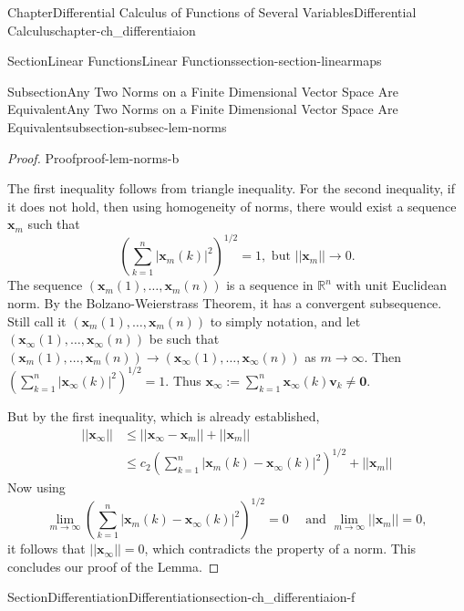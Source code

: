 \documentclass[oneside,10pt,]{book}
\numberwithin{equation}{section}
\newcommand{\amp}{&}
\begin{document}
\begin{chapterptx}{Chapter}{Differential Calculus of Functions of Several Variables}{}{Differential Calculus}{}{}{chapter-ch_differentiaion}
\begin{sectionptx}{Section}{Linear Functions}{}{Linear Functions}{}{}{section-section-linearmaps}
\begin{subsectionptx}{Subsection}{Any Two Norms on a Finite Dimensional Vector Space Are Equivalent}{}{Any Two Norms on a Finite Dimensional Vector Space Are Equivalent}{}{}{subsection-subsec-lem-norms}
\begin{proof}{Proof}{}{proof-lem-norms-b}
\par
The first inequality follows from triangle inequality. For the second inequality, if it does not hold, then using homogeneity of norms, there would exist a sequence \({\mathbf x}_{m}\) such that%
\begin{equation*}
\left(\sum_{k=1}^{n}|{\mathbf x}_{m}(k)|^{2}\right)^{1/2}=1, \text{ but } ||{\mathbf x}_{m}||\to 0.
\end{equation*}
The sequence \(({\mathbf x}_m(1), \ldots, {\mathbf x}_m(n))\) is a sequence in \(\mathbb R^{n}\) with unit Euclidean norm. By the Bolzano-Weierstrass Theorem, it has a convergent subsequence. Still call it \(({\mathbf x}_m(1), \ldots, {\mathbf x}_m(n))\) to simply notation, and let \(({\mathbf x}_{\infty}(1), \ldots, {\mathbf x}_{\infty}(n))\) be such that \(({\mathbf x}_{m}(1), \ldots, {\mathbf x}_{m}(n))\to ({\mathbf x}_{\infty}(1), \ldots, {\mathbf x}_{\infty}(n))\) as \(m\to \infty\). Then \(\left(\sum_{k=1}^{n}|{\mathbf x}_{\infty}(k)|^{2}\right)^{1/2}=1\). Thus \({\mathbf x}_{\infty}:=\sum_{k=1}^{n}{\mathbf x}_{\infty}(k) {\mathbf v}_{k}\ne {\mathbf 0}\).%
\par
But  by the first inequality, which is already established,%
\begin{align*}
||{\mathbf x}_{\infty} || \amp \le  ||{\mathbf x}_{\infty}- {\mathbf x}_{m}|| +  ||{\mathbf x}_{m} ||\\
\amp \le c_{2} \left(\sum_{k=1}^{n}|{\mathbf x}_{m}(k)-{\mathbf x}_{\infty}(k)|^{2}\right)^{1/2} + 
||{\mathbf x}_{m} ||
\end{align*}
Now using%
\begin{equation*}
\lim_{m\to \infty} \left(\sum_{k=1}^{n}|{\mathbf x}_{m}(k)-{\mathbf x}_{\infty}(k)|^{2}\right)^{1/2}=0 \quad
\text{ and } \lim_{m\to \infty}  ||{\mathbf x}_{m} ||=0,
\end{equation*}
it follows that \(||{\mathbf x}_{\infty} || =0\), which contradicts the property of a norm. This concludes our proof of the Lemma.%
\end{proof}
\end{subsectionptx}
\end{sectionptx}
%
%
\typeout{************************************************}
\typeout{************************************************}
%
\begin{sectionptx}{Section}{Differentiation}{}{Differentiation}{}{}{section-ch_differentiaion-f}
\begin{introduction}{}%

\end{introduction}
\end{sectionptx}
\end{chapterptx}
\end{document}
